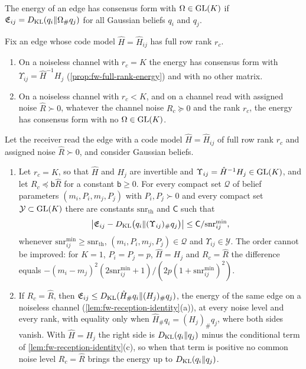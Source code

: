 The energy of an edge has consensus form with $\Omega\in\mathrm{GL}(K)$ if $\mathfrak E_{ij}=D_{\mathrm{KL}}(q_i\Vert\Omega_\#q_j)$ for all Gaussian beliefs $q_i$ and $q_j$.

\begin{proposition}\label{prop:fw-consensus-form}
Fix an edge whose code model $\hat H=\hat H_{ij}$ has full row rank $r_c$.
\begin{enumerate}
\item[(a)] On a noiseless channel with $r_c=K$ the energy has consensus form with $\Upsilon_{ij}=\hat H^{-1}H_j$ (\cref{prop:fw-full-rank-energy}) and with no other matrix.
\item[(b)] On a noiseless channel with $r_c<K$, and on a channel read with assigned noise $\hat R\succ0$, whatever the channel noise $R_c\succeq0$ and the rank $r_c$, the energy has consensus form with no $\Omega\in\mathrm{GL}(K)$.
\end{enumerate}
\end{proposition}

\begin{proposition}\label{prop:fw-noisy-energy}
Let the receiver read the edge with a code model $\hat H=\hat H_{ij}$ of full row rank $r_c$ and assigned noise $\hat R\succ0$, and consider Gaussian beliefs.
\begin{enumerate}
\item[(a)] Let $r_c=K$, so that $\hat H$ and $H_j$ are invertible and $\Upsilon_{ij}=\hat H^{-1}H_j\in\mathrm{GL}(K)$, and let $R_c\preceq\mathsf b\hat R$ for a constant $\mathsf b\ge0$. For every compact set $\mathcal Q$ of belief parameters $(m_i,P_i,m_j,P_j)$ with $P_i,P_j\succ0$ and every compact set $\mathcal Y\subset\mathrm{GL}(K)$ there are constants $\mathrm{snr}_{\mathrm{th}}$ and $\mathsf C$ such that
\[
\bigl\lvert\mathfrak E_{ij}-D_{\mathrm{KL}}\bigl(q_i\Vert(\Upsilon_{ij})_\#q_j\bigr)\bigr\rvert\le\mathsf C/\mathrm{snr}^{\min}_{ij},
\]
whenever $\mathrm{snr}^{\min}_{ij}\ge\mathrm{snr}_{\mathrm{th}}$, $(m_i,P_i,m_j,P_j)\in\mathcal Q$ and $\Upsilon_{ij}\in\mathcal Y$. The order cannot be improved: for $K=1$, $P_i=P_j=p$, $\hat H=H_j$ and $R_c=\hat R$ the difference equals $-(m_i-m_j)^2(2\mathrm{snr}^{\min}_{ij}+1)/(2p(1+\mathrm{snr}^{\min}_{ij})^2)$.
\item[(b)] If $R_c=\hat R$, then $\mathfrak E_{ij}\le D_{\mathrm{KL}}(\hat H_\#q_i\Vert(H_j)_\#q_j)$, the energy of the same edge on a noiseless channel (\cref{lem:fw-reception-identity}(a)), at every noise level and every rank, with equality only when $\hat H_\#q_i=(H_j)_\#q_j$, where both sides vanish. With $\hat H=H_j$ the right side is $D_{\mathrm{KL}}(q_i\Vert q_j)$ minus the conditional term of \cref{lem:fw-reception-identity}(c), so when that term is positive no common noise level $R_c=\hat R$ brings the energy up to $D_{\mathrm{KL}}(q_i\Vert q_j)$.
\end{enumerate}
\end{proposition}

